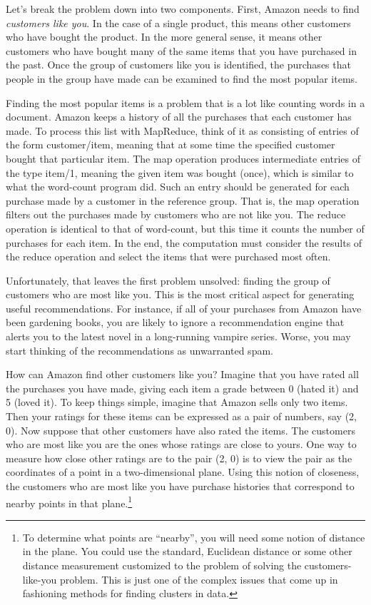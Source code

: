 Let's break the problem down into
two components.  First, Amazon
needs to find \emph{customers like you}.
In the case of a single product, this means other customers who
have bought the product.  In the more general sense,
it means other customers who have bought many
of the same items that you have purchased in the past.
Once the group of
customers like you is identified, the purchases
that people in the group have made can be examined
to find the most popular items.

Finding the most popular items is a problem that is a lot like
counting words in a document.
Amazon keeps a history of all the purchases that each
customer has made.  To process this list with MapReduce, think of it as
consisting of entries of the form customer/item, meaning that at some time the specified
customer bought that particular item.
The map operation produces intermediate entries of the type item/1, meaning
the given item was bought (once),
which is similar to what the word-count program did.
Such an entry should be generated for
each purchase made by a customer in the reference group.  That is,
the map operation filters out the purchases made by customers who are
not like you. The reduce operation is identical to that of word-count,
but this time it counts the number of purchases for each item.
In the end, the computation must consider the results of the reduce operation
and select the items that were purchased most often.

Unfortunately, that leaves the first problem unsolved: finding the group of
customers who are most like you.  This is the most critical aspect for
generating useful recommendations.  For instance, if all of your purchases
from Amazon have been gardening books, you are likely to ignore a
recommendation engine that alerts you to the latest novel in a long-running
vampire series.  Worse, you may start thinking of the recommendations
as unwarranted spam.

How can Amazon find other customers like you?  Imagine that
you have rated all the purchases you have made, giving each item a grade between
0 (hated it) and 5 (loved it).  To keep things simple, imagine that Amazon
sells only two items.  Then your ratings for these items can be expressed as
a pair of numbers, say (2, 0).  Now suppose that other customers have also
rated the items.  The customers who are most like you are the ones
whose ratings are close to yours.
One way to measure how close other ratings are to the pair (2, 0)
is to view the pair
as the coordinates of a point in a two-dimensional plane.
Using this notion of closeness, the customers who
are most like you have purchase histories that correspond to nearby
points in that plane.\footnote{To
determine what points are ``nearby'', you will need
some notion of distance in the plane. You could use the standard,
Euclidean distance or some other distance measurement customized
to the problem of solving the customers-like-you problem.
This is just one of the complex issues that come up
in fashioning methods for finding clusters in data.}

